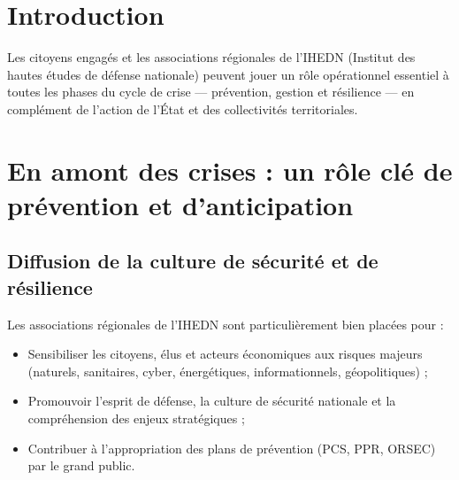 \documentclass[12pt,a4paper]{article}
\begin{document}

\tableofcontents

\newpage

\section{Introduction}

Les citoyens engagés et les associations régionales de l'IHEDN (Institut des hautes études de défense nationale) peuvent jouer un rôle opérationnel essentiel à toutes les phases du cycle de crise — prévention, gestion et résilience — en complément de l'action de l'État et des collectivités territoriales.

\section{En amont des crises : un rôle clé de prévention et d'anticipation}

\subsection{Diffusion de la culture de sécurité et de résilience}

Les associations régionales de l'IHEDN sont particulièrement bien placées pour :

\begin{itemize}
    \item Sensibiliser les citoyens, élus et acteurs économiques aux risques majeurs (naturels, sanitaires, cyber, énergétiques, informationnels, géopolitiques) ;
    \item Promouvoir l'esprit de défense, la culture de sécurité nationale et la compréhension des enjeux stratégiques ;
    \item Contribuer à l'appropriation des plans de prévention (PCS, PPR, ORSEC) par le grand public.
\end{itemize}
\end{document}
